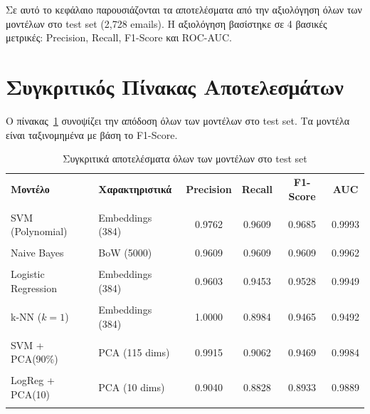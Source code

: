 \documentclass[12pt,a4paper,twoside]{book}
\begin{document}
Σε αυτό το κεφάλαιο παρουσιάζονται τα αποτελέσματα από την αξιολόγηση όλων των μοντέλων στο test set (2,728 emails). Η αξιολόγηση βασίστηκε σε 4 βασικές μετρικές: Precision, Recall, F1-Score και ROC-AUC.

\section{Συγκριτικός Πίνακας Αποτελεσμάτων}

Ο πίνακας~\ref{tab:overall-results} συνοψίζει την απόδοση όλων των μοντέλων στο test set. Τα μοντέλα είναι ταξινομημένα με βάση το F1-Score.

\begin{table}[H]
    \centering
    \begin{tabular}{llcccc}
        \hline
        \textbf{Μοντέλο}    & \textbf{Χαρακτηριστικά} & \textbf{Precision} & \textbf{Recall} & \textbf{F1-Score} & \textbf{AUC} \\\\
        \hline
        SVM (Polynomial)    & Embeddings (384)        & 0.9762             & 0.9609          & 0.9685            & 0.9993       \\\\
        Naive Bayes         & BoW (5000)              & 0.9609             & 0.9609          & 0.9609            & 0.9962       \\\\
        Logistic Regression & Embeddings (384)        & 0.9603             & 0.9453          & 0.9528            & 0.9949       \\\\
        k-NN (\(k=1\))      & Embeddings (384)        & 1.0000             & 0.8984          & 0.9465            & 0.9492       \\\\
        SVM + PCA(90\%)     & PCA (115 dims)          & 0.9915             & 0.9062          & 0.9469            & 0.9984       \\\\
        LogReg + PCA(10)    & PCA (10 dims)           & 0.9040             & 0.8828          & 0.8933            & 0.9889       \\\\
        \hline
    \end{tabular}
    \caption{Συγκριτικά αποτελέσματα όλων των μοντέλων στο test set}
    \label{tab:overall-results}
\end{table}
\end{document}
